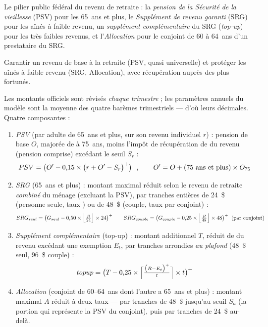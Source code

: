 
\pdesc Le pilier public fédéral du revenu de retraite : la \emph{pension de
la Sécurité de la vieillesse} (PSV) pour les 65~ans et plus, le
\emph{Supplément de revenu garanti} (SRG) pour les aînés à faible revenu,
un \emph{supplément complémentaire} du SRG (\emph{top-up}) pour les très
faibles revenus, et l'\emph{Allocation} pour le conjoint de 60 à 64~ans
d'un prestataire du SRG.

\pobj Garantir un revenu de base à la retraite (PSV, quasi universelle) et
protéger les aînés à faible revenu (SRG, Allocation), avec récupération
auprès des plus fortunés.

\pregle Les montants officiels sont révisés \emph{chaque trimestre} ; les
paramètres annuels du modèle sont la moyenne des quatre barèmes
trimestriels --- d'où leurs décimales. Quatre composantes :

\begin{enumerate}
  \item \emph{PSV} (par adulte de 65~ans et plus, sur son revenu
        individuel $r$) : pension de base $O$, majorée de  à
        75~ans, moins l'impôt de récupération de  du revenu
        (pension comprise) excédant le seuil $S_r$ :
        \[
        PSV = \bigl(O' - 0{,}15 \times \bigl(r + O' - S_r\bigr)^{+}\bigr)^{+},
        \qquad O' = O + \mathrm{(75~ans~et~plus)} \times O_{75}
        \]
  \item \emph{SRG} (65~ans et plus) : montant maximal réduit selon le
        revenu de retraite \emph{combiné} du ménage (excluant la PSV), par
        tranches entières de 24~\$ (personne seule, taux ) ou de
        48~\$ (couple, taux  par conjoint) :
        \[
        SRG_{seul} = \bigl(G_{seul} - 0{,}50 \times
        \Bigl\lfloor \tfrac{R}{24} \Bigr\rfloor \times 24\bigr)^{+}
        \qquad
        SRG_{couple} = \bigl(G_{couple} - 0{,}25 \times
        \Bigl\lfloor \tfrac{R}{48} \Bigr\rfloor \times 48\bigr)^{+}
        \;\;\text{(par conjoint)}
        \]
  \item \emph{Supplément complémentaire} (top-up) : montant additionnel
        $T$, réduit de  du revenu excédant une exemption $E_t$,
        par tranches arrondies \emph{au plafond} (48~\$ seul, 96~\$
        couple) :
        \[
        topup = \bigl(T - 0{,}25 \times
        \Bigl\lceil \tfrac{\bigl(R - E_t\bigr)^{+}}{t} \Bigr\rceil \times t\bigr)^{+}
        \]
  \item \emph{Allocation} (conjoint de 60--64~ans dont l'autre a 65~ans et
        plus) : montant maximal $A$ réduit à deux taux ---  par
        tranches de 48~\$ jusqu'au seuil $S_a$ (la portion qui représente
        la PSV du conjoint), puis  par tranches de 24~\$ au-delà.
\end{enumerate}

